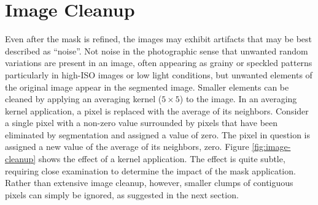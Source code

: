 \documentclass[letterpaper, notitlepage]{report}
\begin{document}
{\section{Image Cleanup}
Even after the mask is refined, the images may exhibit artifacts that may be best described as ``noise''. Not noise in the photographic sense that unwanted random variations are present in an image, often appearing as grainy or speckled patterns particularly in high-ISO images or low light conditions, but unwanted elements of the original image appear in the segmented image. Smaller elements can be cleaned by applying an averaging kernel ($5\times5$) to the image. In an averaging kernel application, a pixel is replaced with the average of its neighbors. Consider a single pixel with a non-zero value surrounded by pixels that have been eliminated by segmentation and assigned a value of zero. The pixel in question is assigned a new value of the average of its neighbors, zero. Figure \ref{fig:image-cleanup} shows the effect of a kernel application. The effect is quite subtle, requiring close examination to determine the impact of the mask application. Rather than extensive image cleanup, however, smaller clumps of contiguous pixels can simply be ignored, as suggested in the next section.

}
\end{document}
